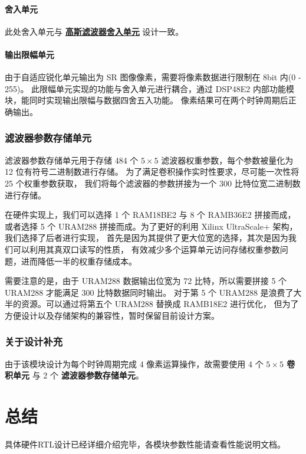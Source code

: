 \documentclass[12pt, a4paper, oneside]{ctexbook}
\begin{document}
	\subsubsection{舍入单元}
	此处舍入单元与 \hyperref[round_unit]{\textbf{高斯滤波器舍入单元}} 设计一致。		
	\subsubsection{输出限幅单元}
	由于自适应锐化单元输出为 SR 图像像素，需要将像素数据进行限制在 8bit 内(0 - 255)。
	此限幅单元实现的功能与舍入单元进行耦合，通过 DSP48E2 内部功能模块，能同时实现输出限幅与数据四舍五入功能。
	像素结果可在两个时钟周期后正确输出。
	\subsection{滤波器参数存储单元}
	滤波器参数存储单元用于存储 484 个 $5\times5$ 滤波器权重参数，每个参数被量化为 12 位有符号二进制数进行存储。
	为了满足卷积操作实时性要求，尽可能一次性将 25 个权重参数获取，
	我们将每个滤波器的参数拼接为一个 300 比特位宽二进制数进行存储。
	\par 在硬件实现上，我们可以选择 1 个 RAM18BE2 与 8 个 RAMB36E2 拼接而成，
	或者选择 5 个 URAM288 拼接而成。为了更好的利用 Xilinx UltraScale+ 架构，我们选择了后者进行实现，
	首先是因为其提供了更大位宽的选择，其次是因为我们可以利用其真双口读写的性质，
	有效减少多个运算单元访问存储权重参数问题，进而降低一半的权重存储成本。
	\par 需要注意的是，由于 URAM288 数据输出位宽为 72 比特，所以需要拼接 5 个 URAM288 才能满足 300 比特数据同时输出。
	对于第 5 个 URAM288 是浪费了大半的资源。可以通过将第五个 URAM288 替换成 RAMB18E2 进行优化，
	但为了方便设计以及存储架构的兼容性，暂时保留目前设计方案。
	\subsection{关于设计补充} 
	由于该模块设计为每个时钟周期完成 4 像素运算操作，故需要使用 4 个 \textbf{ $5\times5$ 卷积单元} 与 2 个 \textbf{滤波器参数存储单元}。
	
	\chapter{总结}
	具体硬件RTL设计已经详细介绍完毕，各模块参数性能请查看性能说明文档。
	
\end{document}
